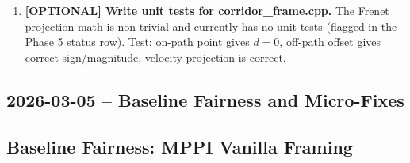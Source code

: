 \documentclass[11pt]{article}
\newcommand{\logentry}[1]{\subsection*{#1}}
\begin{document}
\begin{enumerate}
  \item \textbf{[OPTIONAL] Write unit tests for corridor\_frame.cpp.}
    The Frenet projection math is non-trivial and currently has no unit tests
    (flagged in the Phase 5 status row). Test: on-path point gives $d=0$,
    off-path offset gives correct sign/magnitude, velocity projection is correct.
\end{enumerate}


\logentry{2026-03-05 -- Baseline Fairness and Micro-Fixes}

\subsection*{Baseline Fairness: MPPI Vanilla Framing}
\end{document}
